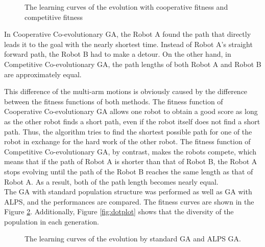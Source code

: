 \documentclass[12pt]{article} %
\begin{document}
\begin{figure}[H] %
\caption{The learning curves of the evolution with cooperative fitness and competitive fitness}
\label{fig:learningcurve}
\end{figure}


In Cooperative Co-evolutionary GA, the Robot A found the path that directly leads it to the goal with the nearly shortest time. Instead of Robot A's straight forward path, the Robot B had to make a detour. On the other hand, in Competitive Co-evolutionary GA, the path lengths of both Robot A and Robot B are approximately equal. 

This difference of the multi-arm motions is obviously caused by the difference between the fitness functions of both methods. The fitness function of Cooperative Co-evolutionary GA allows one robot to obtain a good score as long as the other robot finds a short path, even if the robot itself does not find a short path. Thus, the algorithm tries to find the shortest possible path for one of the robot in exchange for the hard work of the other robot. The fitness function of Competitive Co-evolutionary GA, by contrast, makes the robots compete, which means that if the path of Robot A is shorter than that of Robot B, the Robot A stops evolving until the path of the Robot B reaches the same length as that of Robot A. As a result, both of the path length becomes nearly equal. \\

The GA with standard population structure was performed as well as GA with ALPS, and the performances are compared. The fitness curves are shown in the Figure \ref{fig:learningcurve2}. Additionally, Figure \ref{fig:dotplot} shows that the diversity of the population in each generation. \\

\begin{figure}[H] %
\caption{The learning curves of the evolution by standard GA and ALPS GA.}
\label{fig:learningcurve2}
\end{figure}
\end{document}
